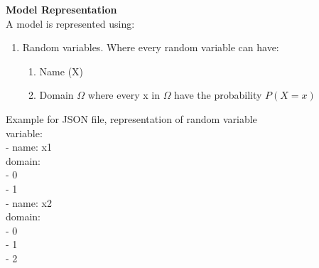 \documentclass{article}
\begin{document}
    \textbf{Model Representation}\\
    A model is represented using:
    \vspace{0.1cm}
    \begin{enumerate}
        \item Random variables. Where every random variable can have:
        \begin{enumerate}
            \item Name (X)
            \item Domain $\Omega$ where every x in $\Omega$ have the probability $P(X=x)$
        \end{enumerate}
    \end{enumerate}
    Example for JSON file, representation of random variable\\
    variable:\\
            \-\quad - name: x1\\
            \-\quad\quad   domain:\\
            \-\quad\quad - 0\\
            \-\quad\quad - 1\\
            \-\quad - name: x2\\
            \-\quad\quad   domain:\\
            \-\quad\quad - 0\\
            \-\quad\quad - 1\\
            \-\quad\quad - 2\\
    
\end{document}
